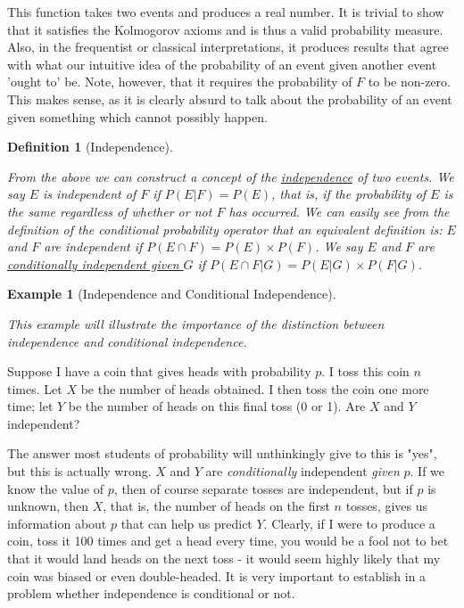 \documentclass[12pt,a4paper]{article}
\newtheorem{defn}[thm]{Definition}
\newtheorem{ex}[thm]{Example}
\begin{document}
This function takes two events and produces a real number. It is trivial to show that it satisfies the Kolmogorov axioms and is thus a valid probability measure. Also, in the frequentist or classical interpretations, it produces results that agree with what our intuitive idea of the probability of an event given another event 'ought to' be. Note, however, that it requires the probability of $F$ to be non-zero. This makes sense, as it is clearly absurd to talk about the probability of an event given something which cannot possibly happen.

\begin{defn}[Independence]$\;$\par
\vspace{12pt}

From the above we can construct a concept of the \underline{independence} of two events. We say $E$ is independent of $F$ if $P(E|F) = P(E)$, that is, if the probability of $E$ is the same regardless of whether or not $F$ has occurred. We can easily see from the definition of the conditional probability operator that an equivalent definition is: $E$ and $F$ are independent if $P(E \cap F) = P(E) \times P(F)$. We say $E$ and $F$ are \underline{conditionally independent given $G$} if $P(E \cap F | G) = P(E|G) \times P(F|G)$.
\end{defn}

\begin{ex}[Independence and Conditional Independence]$\;$\par
\vspace{12pt}

This example will illustrate the importance of the distinction between independence and conditional independence.
\end{ex}

Suppose I have a coin that gives heads with probability $p$. I toss this coin $n$ times. Let $X$ be the number of heads obtained. I then toss the coin one more time; let $Y$ be the number of heads on this final toss (0 or 1). Are $X$ and $Y$ independent?

The answer most students of probability will unthinkingly give to this is "yes", but this is actually wrong. $X$ and $Y$ are {\it conditionally} independent {\it given} $p$. If we know the value of $p$, then of course separate tosses are independent, but if $p$ is unknown, then $X$, that is, the number of heads on the first $n$ tosses, gives us information about $p$ that can help us predict $Y$. Clearly, if I were to produce a coin, toss it 100 times and get a head every time, you would be a fool not to bet that it would land heads on the next toss - it would seem highly likely that my coin was biased or even double-headed. It is very important to establish in a problem whether independence is conditional or not.
\end{document}
